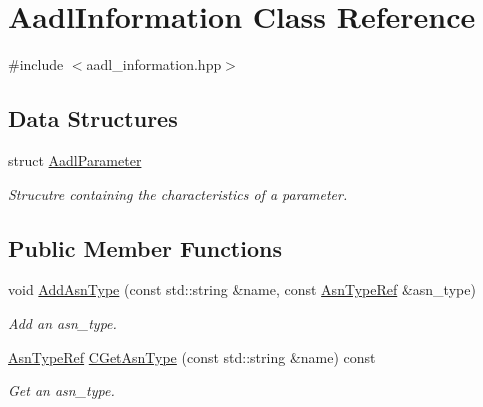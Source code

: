\hypertarget{classAadlInformation}{}\section{Aadl\+Information Class Reference}
\label{classAadlInformation}


{\ttfamily \#include $<$aadl\+\_\+information.\+hpp$>$}

\subsection*{Data Structures}
\begin{DoxyCompactItemize}
\item 
struct \hyperlink{structAadlInformation_1_1AadlParameter}{Aadl\+Parameter}
\begin{DoxyCompactList}\small\item\em Strucutre containing the characteristics of a parameter. \end{DoxyCompactList}\end{DoxyCompactItemize}
\subsection*{Public Member Functions}
\begin{DoxyCompactItemize}
\item 
void \hyperlink{classAadlInformation_a8926df49d647b748f1b6aa30f639b175}{Add\+Asn\+Type} (const std\+::string \&name, const \hyperlink{asn__type_8hpp_a456d7cf50c15d087cc0428ae80834b35}{Asn\+Type\+Ref} \&asn\+\_\+type)
\begin{DoxyCompactList}\small\item\em Add an asn\+\_\+type. \end{DoxyCompactList}\item 
\hyperlink{asn__type_8hpp_a456d7cf50c15d087cc0428ae80834b35}{Asn\+Type\+Ref} \hyperlink{classAadlInformation_a0b0282f4f689aa9e7e0d5ed533d9cfde}{C\+Get\+Asn\+Type} (const std\+::string \&name) const
\begin{DoxyCompactList}\small\item\em Get an asn\+\_\+type. \end{DoxyCompactList}\end{DoxyCompactItemize}

